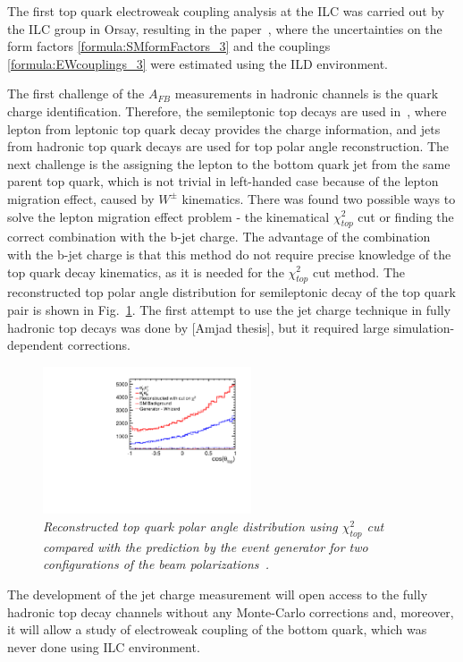 The first top quark electroweak coupling analysis at the ILC was carried out by the ILC group in Orsay, resulting in the paper~\cite{bib:ILCTOP}, where the uncertainties on the form factors \ref{formula:SMformFactors_3} and the couplings \ref{formula:EWcouplings_3} were estimated using the ILD environment.


The first challenge of the $A_{FB}$ measurements in hadronic channels is the quark charge identification. Therefore, the semileptonic top decays are used in~\cite{bib:ILCTOP}, where lepton from leptonic top quark decay provides the charge information, and jets from hadronic top quark decays are used for top polar angle reconstruction. 
The next challenge is the assigning the lepton to the bottom quark jet from the same parent top quark, which is not trivial in left-handed case because of the lepton migration effect, caused by $W^\pm$ kinematics. There was found two possible ways to solve the lepton migration effect problem - the kinematical $\chi^2_{top}$ cut or finding the correct combination with the b-jet charge. The advantage of the combination with the b-jet charge is that this method do not require precise knowledge of the top quark decay kinematics, as it is needed for the $\chi^2_{top}$ cut method. The reconstructed top polar angle distribution for semileptonic decay of the top quark pair is shown in Fig.~\ref{fig:ILCTOPAFB}.
The first attempt to use the jet charge technique in fully hadronic top decays was done by [Amjad thesis], but it required large simulation-dependent corrections. 
\begin{figure}[h]
{\centering
    \includegraphics[width=0.55\textwidth]{ILD/graphics/AFB_wbkg_chi2cut.pdf}
    \caption{\sl Reconstructed top quark polar angle distribution using $\chi^2_{top}$ cut compared with the prediction by the event generator for two configurations of the beam polarizations~\cite{bib:ILCTOP}.}
    \label{fig:ILCTOPAFB}
  }
\end{figure}

The development of the jet charge measurement will open access to the fully hadronic top decay channels without any Monte-Carlo corrections and, moreover, it will allow a study of electroweak coupling of the bottom quark, which was never done using ILC environment. 


